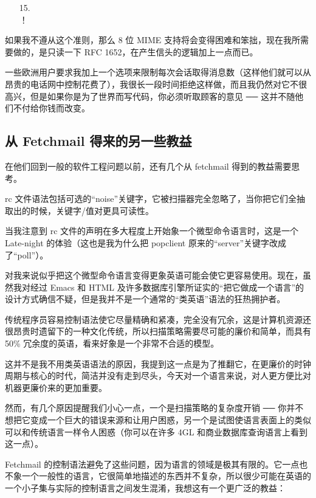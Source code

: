 \begin{enumerate}
\item[15.] \\ ！
\end{enumerate}

如果我不遵从这个准则，那么 8 位 MIME 支持将会变得困难和笨拙，现在我所需要做的，是只读一下 RFC 1652，在产生信头的逻辑加上一点而已。


一些欧洲用户要求我加上一个选项来限制每次会话取得消息数（这样他们就可以从昂贵的电话网中控制花费了），我很长一段时间拒绝这样做，而且我仍然对它不很高兴，但是如果你是为了世界而写代码，你必须听取顾客的意见 ── 这并不随他们不付给你钱而改变。


\subsection{从 Fetchmail 得来的另一些教益}


在他们回到一般的软件工程问题以前，还有几个从 fetchmail 得到的教益需要思考。


rc 文件语法包括可选的“noise”关键字，它被扫描器完全忽略了，当你把它们全抽取出的时候，关键字/值对更具可读性。


当我注意到 rc 文件的声明在多大程度上开始象一个微型命令语言时，这是一个 Late-night 的体验（这也是我为什么把 popclient 原来的“server”关键字改成了“poll”）。


对我来说似乎把这个微型命令语言变得更象英语可能会使它更容易使用。现在，虽然我对经过 Emacs 和 HTML 及许多数据库引擎所证实的“把它做成一个语言”的设计方式确信不疑，但是我并不是一个通常的“类英语”语法的狂热拥护者。


传统程序员容易控制语法使它尽量精确和紧凑，完全没有冗余，这是计算机资源还很昂贵时遗留下的一种文化传统，所以扫描策略需要尽可能的廉价和简单，而具有 50\% 冗余度的英语，看来好象是一个非常不合适的模型。


这并不是我不用类英语语法的原因，我提到这一点是为了推翻它，在更廉价的时钟周期与核心的时代，简洁并没有走到尽头，今天对一个语言来说，对人更方便比对机器更廉价来的更加重要。


然而，有几个原因提醒我们小心一点，一个是扫描策略的复杂度开销 ── 你并不想把它变成一个巨大的错误来源和让用户困惑，另一个是试图使语言表面上的类似可以和传统语言一样令人困惑（你可以在许多 4GL 和商业数据库查询语言上看到这一点）。


Fetchmail 的控制语法避免了这些问题，因为语言的领域是极其有限的。它一点也不象一个一般性的语言，它很简单地描述的东西并不复杂，所以很少可能在英语的一个小子集与实际的控制语言之间发生混淆，我想这有一个更广泛的教益：

